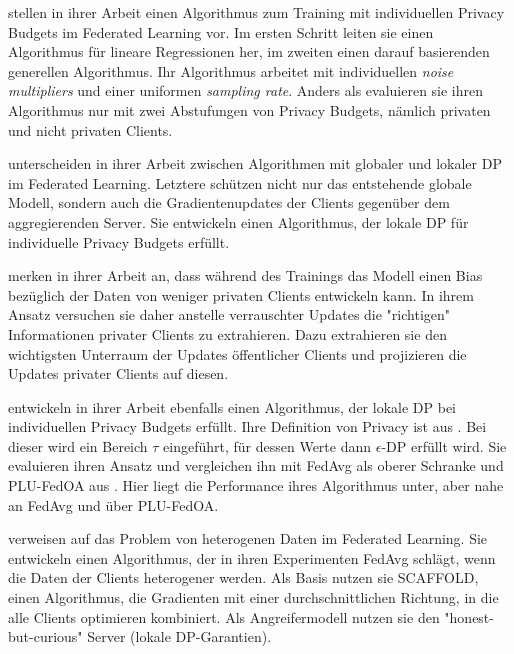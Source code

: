 \textcite{aldaghri:2023} stellen in ihrer Arbeit einen Algorithmus zum Training mit individuellen Privacy Budgets im Federated Learning vor. Im ersten Schritt leiten sie einen Algorithmus für lineare Regressionen her, im zweiten einen darauf basierenden generellen Algorithmus. Ihr Algorithmus arbeitet mit individuellen \textit{noise multipliers} und einer uniformen \textit{sampling rate}. Anders als \citeauthor{boenisch:2023} evaluieren sie ihren Algorithmus nur mit zwei Abstufungen von Privacy Budgets, nämlich privaten und nicht privaten Clients.

\textcite{yang:2021} unterscheiden in ihrer Arbeit zwischen Algorithmen mit globaler und lokaler DP im Federated Learning. Letztere schützen nicht nur das entstehende globale Modell, sondern auch die Gradientenupdates der Clients gegenüber dem aggregierenden Server. Sie entwickeln einen Algorithmus, der lokale DP für individuelle Privacy Budgets erfüllt.

\textcite{liu:2021} merken in ihrer Arbeit an, dass während des Trainings das Modell einen Bias bezüglich der Daten von weniger privaten Clients entwickeln kann. In ihrem Ansatz versuchen sie daher anstelle verrauschter Updates die "richtigen" Informationen privater Clients zu extrahieren. Dazu extrahieren sie den wichtigsten Unterraum der Updates öffentlicher Clients und projizieren die Updates privater Clients auf diesen.

\textcite{shen:2023} entwickeln in ihrer Arbeit ebenfalls einen Algorithmus, der lokale DP bei individuellen Privacy Budgets erfüllt. Ihre Definition von Privacy ist aus \textcite{chen:2016}. Bei dieser wird ein Bereich $\tau$ eingeführt, für dessen Werte dann $\epsilon$-DP erfüllt wird. Sie evaluieren ihren Ansatz und vergleichen ihn mit FedAvg \parencite{mcmahan:2016} als oberer Schranke und PLU-FedOA aus \textcite{yang:2021}. Hier liegt die Performance ihres Algorithmus unter, aber nahe an FedAvg und über PLU-FedOA.

\textcite{noble:2023} verweisen auf das Problem von heterogenen Daten im Federated Learning. Sie entwickeln einen Algorithmus, der in ihren Experimenten FedAvg schlägt, wenn die Daten der Clients heterogener werden. Als Basis nutzen sie SCAFFOLD, einen Algorithmus, die Gradienten mit einer durchschnittlichen Richtung, in die alle Clients optimieren kombiniert. Als Angreifermodell nutzen sie den "honest-but-curious" Server (lokale DP-Garantien). 

